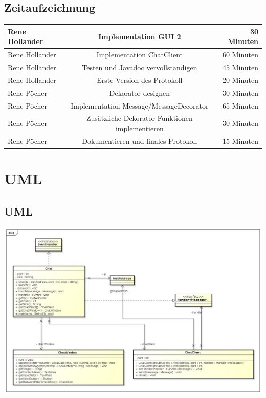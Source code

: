 \documentclass[a4paper, 11pt]{article}
\begin{document}
\subsection{Zeitaufzeichnung}

\begin{tabular}{|l|c|r|}
  \hline
  Rene Hollander & Implementation GUI 2 & 30 Minuten\\
  \hline
  Rene Hollander & Implementation ChatClient & 60 Minuten \\
  \hline
  Rene Hollander & Testen und Javadoc vervollständigen & 45 Minuten \\
  \hline
  Rene Hollander & Erste Version des Protokoll & 20 Minuten \\
  
    \hline
    Rene Pöcher &  Dekorator designen & 30 Minuten\\
    \hline
    Rene Pöcher & Implementation Message/MessageDecorator & 65 Minuten \\
    \hline
    Rene Pöcher & Zusätzliche Dekorator Funktionen implementieren & 30 Minuten \\
    \hline
    Rene Pöcher & Dokumentieren und finales Protokoll & 15 Minuten \\
    \hline
 \end{tabular}

\section{UML}
\subsection{UML}
\includegraphics[width=15.5cm]{UML}
\end{document}
